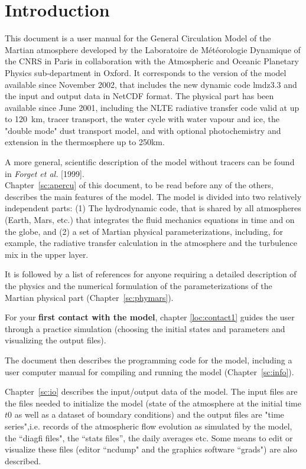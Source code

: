 \chapter{Introduction}

This document is a user manual for the General Circulation Model
of the Martian atmosphere developed by the Laboratoire de M\'et\'eorologie
Dynamique of the CNRS in Paris in collaboration with the Atmospheric and
Oceanic Planetary Physics sub-department in Oxford.
It corresponds to the version of the model available since November 2002,
that includes the new dynamic code lmdz3.3 
and the input and output data in NetCDF format.
The physical part has been available since June 2001,
including the NLTE radiative transfer code valid at up to 120~km,
tracer transport, the water cycle with water vapour and ice,
the "double mode" dust transport model, and with optional photochemistry
and extension in the thermosphere up to 250km. 

A more general, scientific description of the model without
tracers can be found in {\it Forget et al.} [1999].\\


Chapter~\ref{sc:apercu} of this document, to be read before any of the others,
describes the main features of the model.
The model is divided into two relatively independent parts:
(1) The hydrodynamic code, that is shared by all atmospheres (Earth,
Mars, etc.) that integrates the fluid mechanics equations in time
and on the globe, and (2) a set of Martian physical parameterizations,
including, for example, the radiative transfer calculation in the atmosphere
and the turbulence mix in the upper layer.

It is followed by a list of references for anyone requiring a detailed 
description of the physics and the numerical formulation of the 
parameterizations of the Martian physical part (Chapter~\ref{sc:phymars}).

For your {\bf first contact with the model}, chapter
\ref{loc:contact1} guides the user through a practice simulation
(choosing the initial states and parameters and  visualizing the output files).

The document then describes the programming code for the model,
including a user computer manual for compiling and running the model
(Chapter~\ref{sc:info}).

Chapter~\ref{sc:io} describes the input/output data of the model.
The input files are the files needed to initialize the model
(state of the atmosphere at the initial time $t0$ as well as a dataset of
boundary conditions)
and the output files are "time series",i.e.
records of the atmospheric flow evolution as simulated by the model,
the ``diagfi files", the ``stats files'',
the daily averages etc.
Some means to edit or visualize these files
(editor ``ncdump" and the graphics software ``grads") are also described. \\ 


